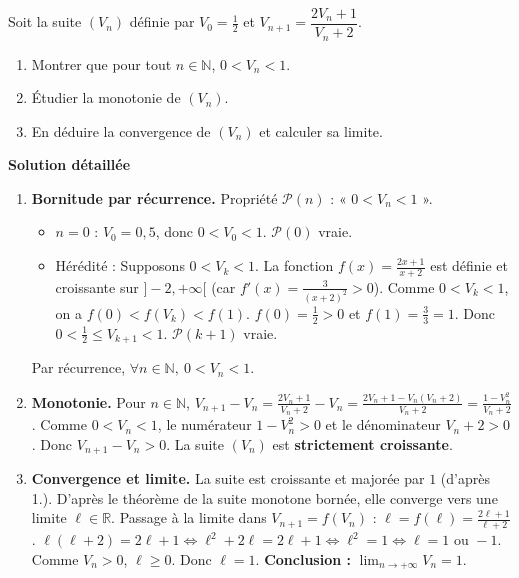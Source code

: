 \documentclass[11pt]{article}
\begin{document}
\begin{exoresolu}
    Soit la suite $(V_n)$ définie par $V_0 = \frac{1}{2}$ et $V_{n+1} = \dfrac{2V_n + 1}{V_n + 2}$.
    \begin{enumerate}
        \item Montrer que pour tout $n \in \mathbb{N}$, $0 < V_n < 1$.
        \item Étudier la monotonie de $(V_n)$.
        \item En déduire la convergence de $(V_n)$ et calculer sa limite.
    \end{enumerate}
    \tcblower
    \textbf{Solution détaillée}
    \begin{enumerate}
        \item \textbf{Bornitude par récurrence.}
        Propriété $\mathcal{P}(n)$ : « $0 < V_n < 1$ ».
        \begin{itemize}
            \item $n=0$ : $V_0 = 0,5$, donc $0 < V_0 < 1$. $\mathcal{P}(0)$ vraie.
            \item Hérédité : Supposons $0 < V_k < 1$. La fonction $f(x) = \frac{2x+1}{x+2}$ est définie et croissante sur $]-2, +\infty[$ (car $f'(x) = \frac{3}{(x+2)^2} > 0$).
            Comme $0 < V_k < 1$, on a $f(0) < f(V_k) < f(1)$.
            $f(0) = \frac{1}{2} > 0$ et $f(1) = \frac{3}{3} = 1$.
            Donc $0 < \frac{1}{2} \le V_{k+1} < 1$. $\mathcal{P}(k+1)$ vraie.
        \end{itemize}
        Par récurrence, $\forall n \in \mathbb{N},\ 0 < V_n < 1$.
        \item \textbf{Monotonie.}
        Pour $n \in \mathbb{N}$, $V_{n+1} - V_n = \frac{2V_n+1}{V_n+2} - V_n = \frac{2V_n+1 - V_n(V_n+2)}{V_n+2} = \frac{1 - V_n^2}{V_n+2}$.
        Comme $0 < V_n < 1$, le numérateur $1-V_n^2 > 0$ et le dénominateur $V_n+2 > 0$.
        Donc $V_{n+1} - V_n > 0$. La suite $(V_n)$ est \textbf{strictement croissante}.
        \item \textbf{Convergence et limite.}
        La suite est croissante et majorée par $1$ (d'après 1.). D'après le théorème de la suite monotone bornée, elle converge vers une limite $\ell \in \mathbb{R}$.
        Passage à la limite dans $V_{n+1} = f(V_n)$ : $\ell = f(\ell) = \frac{2\ell+1}{\ell+2}$.
        $\ell(\ell+2) = 2\ell+1 \iff \ell^2 + 2\ell = 2\ell + 1 \iff \ell^2 = 1 \iff \ell = 1 \text{ ou } -1$.
        Comme $V_n > 0$, $\ell \ge 0$. Donc $\ell = 1$.
        \textbf{Conclusion :} $\lim_{n\to+\infty} V_n = 1$.
    \end{enumerate}
\end{exoresolu}
\end{document}
